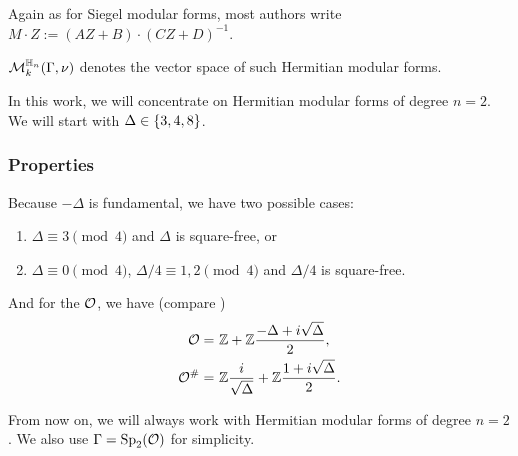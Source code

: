Again as for Siegel modular forms, most authors write $M \cdot Z := (A Z + B) \cdot (C Z + D)^{-1}$.

$\operatorname{\mathcal{M}}^{\mathbb{H}_{n}}_k (\Gamma,\nu)$
denotes the vector space of such Hermitian modular forms.

In this work, we will concentrate on Hermitian modular forms of degree $n=2$. We will start with $\Delta \in \Set{3,4,8}$.

\subsubsection{Properties}
Because $-\Delta$ is fundamental, we have two possible cases:
\begin{enumerate}
\item $\Delta \equiv 3 \pmod{4}$ and $\Delta$ is square-free, or
\item $\Delta \equiv 0 \pmod{4}$, $\Delta/4 \equiv 1,2 \pmod{4}$ and $\Delta/4$ is square-free.
\end{enumerate}
\label{maxorder}
And for the  $\mathcal{O}$, we have (compare \cite{Dern01Herm})
\begin{align*}
\mathcal{O} = &\ \mathbb{Z} +  \mathbb{Z} \frac{-\Delta+i\sqrt{\Delta}}{2} , \\
\mathcal{O}^\# = & \ \mathbb{Z} \frac{i}{\sqrt{\Delta}} + \mathbb{Z} \frac{1 + i\sqrt{\Delta}}{2} .
\end{align*}

From now on, we will always work with Hermitian modular forms of degree $n=2$. We also use $\Gamma = \operatorname{Sp}_2(\mathcal{O})$ for simplicity.

